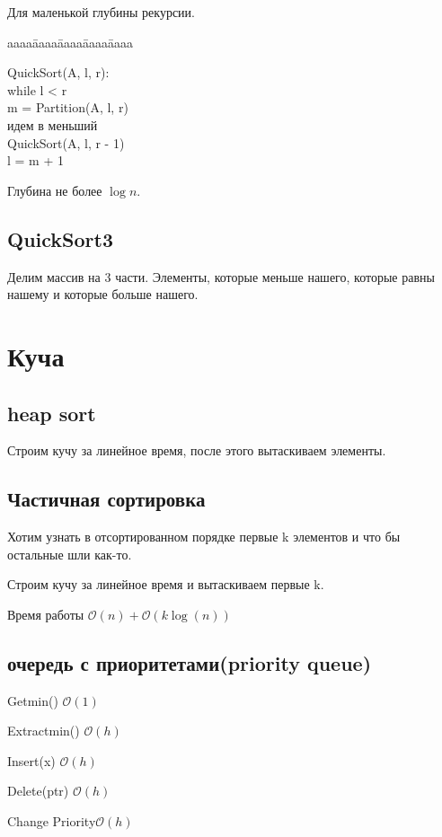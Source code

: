 \documentclass[12pt]{article}
\def\t{\texttt}
\def\O{\mathcal{O}}
\newenvironment{MyTabbing}{
\t\bgroup
\begin{tabbing}
aaaa\=aaaa\=aaaa\=aaaa\=aaaa\kill
}{
\end{tabbing}
\t\egroup
}
\begin{document}
Для маленькой глубины рекурсии.

\begin{MyTabbing}
QuickSort(A, l, r):\\
\>while l < r\\
\>\>m = Partition(A, l, r)\\
\>\>идем в меньший\\
\>\>\>QuickSort(A, l, r - 1)\\
\>\>\>l = m + 1\\
\end{MyTabbing}

Глубина не более $\log n$.

\subsection{QuickSort3}

Делим массив на 3 части. Элементы, которые меньше нашего, которые равны нашему и которые больше нашего. 

\section{Куча}

\subsection{heap sort}
Строим кучу за линейное время, после этого вытаскиваем элементы. 

\subsection{Частичная сортировка}
Хотим  узнать в отсортированном порядке первые k элементов и что бы остальные шли как-то. 

Строим кучу за линейное время и вытаскиваем первые k.

Время работы $\O(n) + \O(k\log(n))$

\subsection{очередь с приоритетами(priority queue)}

Getmin() $\O(1)$

Extractmin() $\O(h)$

Insert(x) $\O(h)$

Delete(ptr) $\O(h)$

Change Priority$\O(h)$
\end{document}
